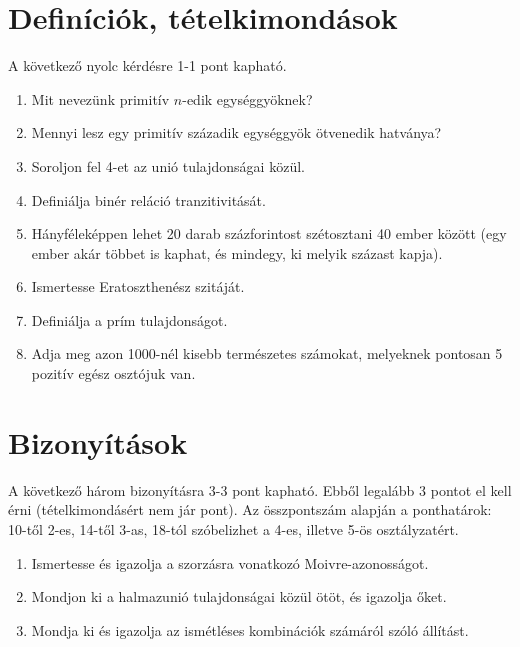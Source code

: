 \documentclass[11pt,a4paper]{article}
\begin{document}
\section{Definíciók, tételkimondások}
A következő nyolc kérdésre 1-1 pont kapható. 
\begin{enumerate}\setlength{\itemsep}{2.2cm}

\item Mit nevezünk primitív $n$-edik egységgyöknek?

\item Mennyi lesz egy primitív századik egységgyök ötvenedik hatványa?

\item Soroljon fel 4-et az unió tulajdonságai közül.

\item Definiálja binér reláció tranzitivitását.

\item Hányféleképpen  lehet 20 darab százforintost szétosztani 40 ember között (egy ember akár többet is kaphat, és mindegy, ki melyik százast kapja).

\item Ismertesse Eratoszthenész szitáját.

\item Definiálja a prím tulajdonságot.

\item Adja meg azon 1000-nél kisebb természetes számokat, melyeknek pontosan 5 pozitív egész osztójuk van.

\end{enumerate}

\newpage
\section{Bizonyítások}
A következő három bizonyításra 3-3 pont kapható. Ebből legalább 3 pontot el kell érni (tételkimondásért nem jár pont).
Az összpontszám alapján a ponthatárok: 10-től 2-es, 14-től 3-as, 18-tól szóbelizhet a 4-es, illetve 5-ös osztályzatért.
\begin{enumerate}

\item Ismertesse és igazolja a szorzásra vonatkozó Moivre-azonosságot.
\item Mondjon ki a halmazunió tulajdonságai közül ötöt, és igazolja őket.
\item Mondja ki és igazolja az ismétléses kombinációk számáról szóló állítást.

\end{enumerate}
\end{document}
